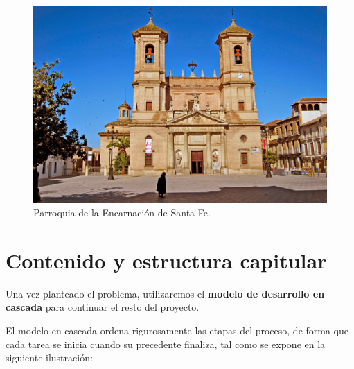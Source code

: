 \begin{figure}[H]
\noindent \begin{centering}
\includegraphics[width=\linewidth]{capitulo1/figura11}
\par\end{centering}
\smallskip
\caption[Parroquia de la Encarnación de Santa Fe.]{\label{fig:figura11} Parroquia de la Encarnación de Santa Fe. \cite{iglesias_granada}}
\end{figure}

\newpage

\section{Contenido y estructura capitular}

Una vez planteado el problema, utilizaremos el \textbf{modelo de desarrollo en cascada} para continuar el resto del proyecto.

El modelo en cascada ordena rigurosamente las etapas del proceso, de forma que cada tarea se inicia cuando su precedente finaliza, tal como se expone en la siguiente ilustración:

\smallskip

